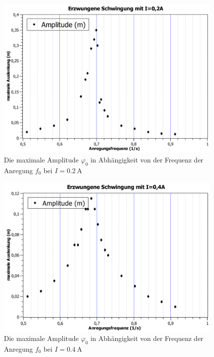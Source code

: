 \documentclass[
	a4paper,
	12pt,
	pagesize,
	ngerman
]{scrartcl}
\begin{document}
	\begin{figure}[H]
		\includegraphics[width=1\textwidth]{erzwungene_Schwingung_0,2A}
		\centering
		\caption{Die maximale Amplitude $ \varphi_0 $ in Abhängigkeit von der Frequenz der Anregung $ f_0 $ bei $I=\SI{0,2}{\ampere}$}
		\label{erzw02A_Schwingung}
		\centering
	\end{figure}
	\begin{figure}[H]
		\includegraphics[width=1\textwidth]{erzwungene_Schwingung_0,4A}
		\centering
		\caption{Die maximale Amplitude $ \varphi_0 $ in Abhängigkeit von der Frequenz der Anregung $ f_0 $  bei $I=\SI{0,4}{\ampere}$}
		\label{erzw04A_Schwingung}
		\centering
	\end{figure}
\end{document}
